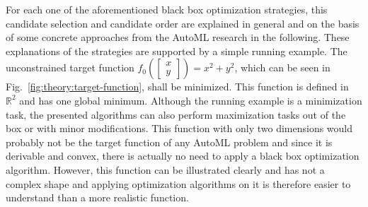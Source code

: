For each one of the aforementioned black box optimization strategies, this candidate selection and candidate order are explained in general and on the basis of some concrete approaches from the AutoML research in the following.
These explanations of the strategies are supported by a simple running example.\newline
The unconstrained target function $f_0 \left( \begin{bmatrix}x\\y \end{bmatrix} \right) = x^2 + y^2$, which can be seen in Fig.~\ref{fig:theory:target-function}, shall be minimized.
This function is defined in $\mathbb{R}^2$ and has one global minimum.
Although the running example is a minimization task, the presented algorithms can also perform maximization tasks out of the box or with minor modifications.\newline
This function with only two dimensions would probably not be the target function of any AutoML problem and since it is derivable and convex, there is actually no need to apply a black box optimization algorithm.
However, this function can be illustrated clearly and has not a complex shape and applying optimization algorithms on it is therefore easier to understand than a more realistic function.

